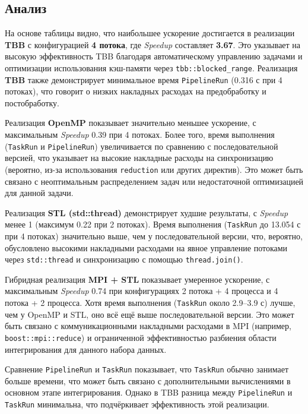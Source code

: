 \documentclass[12pt]{article}
\begin{document}
\subsection*{Анализ}

\hspace*{1.25em}На основе таблицы видно, что наибольшее ускорение достигается в реализации \textbf{TBB} с конфигурацией \textbf{4 потока}, где \textit{Speedup} составляет \textbf{3.67}. Это указывает на высокую эффективность TBB благодаря автоматическому управлению задачами и оптимизации использования кэш-памяти через \texttt{tbb::blocked\_range}. Реализация \textbf{TBB} также демонстрирует минимальное время \texttt{PipelineRun} (0.316 с при 4 потоках), что говорит о низких накладных расходах на предобработку и постобработку.

\hspace*{1.25em}Реализация \textbf{OpenMP} показывает значительно меньшее ускорение, с максимальным \textit{Speedup} 0.39 при 4 потоках. Более того, время выполнения (\texttt{TaskRun} и \texttt{PipelineRun}) увеличивается по сравнению с последовательной версией, что указывает на высокие накладные расходы на синхронизацию (вероятно, из-за использования \texttt{reduction} или других директив). Это может быть связано с неоптимальным распределением задач или недостаточной оптимизацией для данной задачи.

\hspace*{1.25em}Реализация \textbf{STL (std::thread)} демонстрирует худшие результаты, с \textit{Speedup} менее 1 (максимум 0.22 при 2 потоках). Время выполнения (\texttt{TaskRun} до 13.054 с при 4 потоках) значительно выше, чем у последовательной версии, что, вероятно, обусловлено высокими накладными расходами на явное управление потоками через \texttt{std::thread} и синхронизацию с помощью \texttt{thread.join()}.

\hspace*{1.25em}Гибридная реализация \textbf{MPI + STL} показывает умеренное ускорение, с максимальным \textit{Speedup} 0.74 при конфигурациях 2 потока + 4 процесса и 4 потока + 2 процесса. Хотя время выполнения (\texttt{TaskRun} около 2.9--3.9 с) лучше, чем у OpenMP и STL, оно всё ещё выше последовательной версии. Это может быть связано с коммуникационными накладными расходами в MPI (например, \texttt{boost::mpi::reduce}) и ограниченной эффективностью разбиения области интегрирования для данного набора данных.

\hspace*{1.25em}Сравнение \texttt{PipelineRun} и \texttt{TaskRun} показывает, что \texttt{TaskRun} обычно занимает больше времени, что может быть связано с дополнительными вычислениями в основном этапе интегрирования. Однако в TBB разница между \texttt{PipelineRun} и \texttt{TaskRun} минимальна, что подчёркивает эффективность этой реализации.
\end{document}
